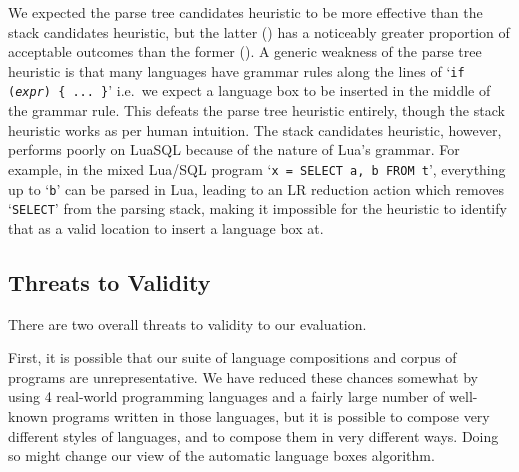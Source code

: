 \documentclass[sigplan,screen]{acmart}
\begin{document}
We expected the parse tree candidates
heuristic to be more effective than the stack candidates heuristic, but the
latter (\validstackoverall) has a noticeably greater proportion of acceptable
outcomes than the former (\validhistoverall). A generic weakness of the parse
tree heuristic is that many languages have grammar rules along the lines of
`\texttt{if (\emph{expr}) \{ ... \}}' i.e.~we expect a language box to be
inserted in the middle of the grammar rule. This defeats the parse tree
heuristic entirely, though the stack heuristic works as per human intuition.
The stack candidates heuristic, however,
performs poorly on LuaSQL because of the nature of Lua's grammar. For example,
in the mixed Lua/SQL program `\texttt{x = SELECT a, b FROM t}', everything up to
`\texttt{b}' can be parsed in Lua, leading to an LR reduction action which
removes `\texttt{SELECT}' from the parsing stack, making it impossible for the
heuristic to identify that as a valid location to insert a language box at.


\subsection{Threats to Validity}

There are two overall threats to validity to our evaluation.

First, it is possible that our suite of language compositions and corpus of
programs are unrepresentative. We have reduced these chances somewhat by using
4 real-world programming languages and a fairly large number of well-known
programs written in those languages, but it is possible to compose
very different styles of languages, and to compose them in very different ways.
Doing so might change our view of the automatic language boxes algorithm.
\end{document}
